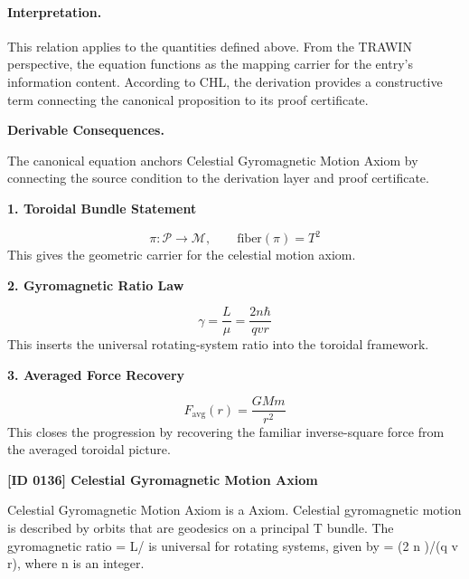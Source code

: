 \paragraph{Interpretation.}
This relation applies to the quantities defined above. From the TRAWIN perspective, the equation functions as the mapping carrier for the entry’s information content. According to CHL, the derivation provides a constructive term connecting the canonical proposition to its proof certificate.

\par\vspace{0.35em}
\noindent\textbf{Derivable Consequences.}\quad
\begingroup
\footnotesize
\raggedright
The canonical equation anchors Celestial Gyromagnetic Motion Axiom by connecting the source condition to the derivation layer and proof certificate.
\par\endgroup

\noindent\textbf{1. Toroidal Bundle Statement}\par
\[
\pi:\mathcal{P}\to \mathcal{M},
\qquad
\mathrm{fiber}(\pi)=T^2
\]
\noindent This gives the geometric carrier for the celestial motion axiom.\par
\noindent\textbf{2. Gyromagnetic Ratio Law}\par
\[
\gamma=\frac{L}{\mu}=\frac{2n\hbar}{qvr}
\]
\noindent This inserts the universal rotating-system ratio into the toroidal framework.\par
\noindent\textbf{3. Averaged Force Recovery}\par
\[
F_{\mathrm{avg}}(r)=\frac{GMm}{r^2}
\]
\noindent This closes the progression by recovering the familiar inverse-square force from the averaged toroidal picture.\par

\clearpage
\noindent\textbf{[ID 0136] Celestial Gyromagnetic Motion Axiom}\par
\vspace{0.35em}
\begingroup\small
{}
Celestial Gyromagnetic Motion Axiom is a Axiom. Celestial gyromagnetic motion is described by orbits that are geodesics on a principal T  bundle. The gyromagnetic ratio   = L/  is universal for rotating systems, given by   = (2 n  )/(q v r), where n is an integer.

